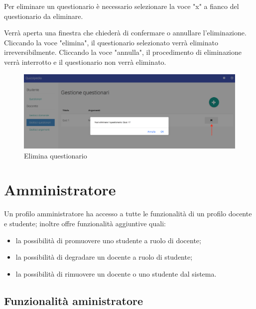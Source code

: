\documentclass[12pt,a4paper]{article}
\begin{document}
		\par Per eliminare un questionario è necessario selezionare la voce "x" a fianco del questionario da eliminare. \\
		\par Verrà aperta una finestra che chiederà di confermare o annullare l'eliminazione. Cliccando la voce "elimina", il questionario selezionato verrà eliminato irreversibilmente. Cliccando la voce "annulla", il procedimento di eliminazione verrà interrotto e il questionario non verrà eliminato. \\
		
		\begin{figure}[H]	
			\centering
			\includegraphics[width=0.8\linewidth]{../img/screenshot/eliminaQuestionario.png}
			\caption{Elimina questionario}
			\label{Elimina questionario}
		\end{figure}
		
		\section{Amministratore}
		\par Un profilo amministratore ha accesso a tutte le funzionalità di un profilo docente e studente; inoltre offre funzionalità aggiuntive quali: \\
		\begin{itemize}
			\item la possibilità di promuovere uno studente a ruolo di docente;
			\item la possibilità di degradare un docente a ruolo di studente;
			\item la possibilità di rimuovere un docente o uno studente dal sistema.
		\end{itemize}
		\subsection{Funzionalità aministratore}
		
\end{document}
